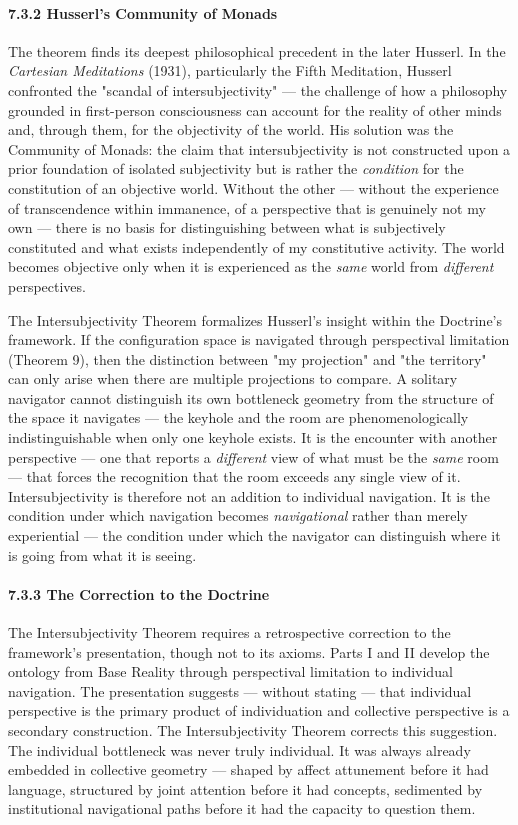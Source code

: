 \paragraph*{7.3.2 Husserl's Community of Monads}


The theorem finds its deepest philosophical precedent in the later Husserl. In the \textit{Cartesian Meditations} (1931), particularly the Fifth Meditation, Husserl confronted the "scandal of intersubjectivity" — the challenge of how a philosophy grounded in first-person consciousness can account for the reality of other minds and, through them, for the objectivity of the world. His solution was the Community of Monads: the claim that intersubjectivity is not constructed upon a prior foundation of isolated subjectivity but is rather the \textit{condition} for the constitution of an objective world. Without the other — without the experience of transcendence within immanence, of a perspective that is genuinely not my own — there is no basis for distinguishing between what is subjectively constituted and what exists independently of my constitutive activity. The world becomes objective only when it is experienced as the \textit{same} world from \textit{different} perspectives.


The Intersubjectivity Theorem formalizes Husserl's insight within the Doctrine's framework. If the configuration space is navigated through perspectival limitation (Theorem 9), then the distinction between "my projection" and "the territory" can only arise when there are multiple projections to compare. A solitary navigator cannot distinguish its own bottleneck geometry from the structure of the space it navigates — the keyhole and the room are phenomenologically indistinguishable when only one keyhole exists. It is the encounter with another perspective — one that reports a \textit{different} view of what must be the \textit{same} room — that forces the recognition that the room exceeds any single view of it. Intersubjectivity is therefore not an addition to individual navigation. It is the condition under which navigation becomes \textit{navigational} rather than merely experiential — the condition under which the navigator can distinguish where it is going from what it is seeing.


\paragraph*{7.3.3 The Correction to the Doctrine}


The Intersubjectivity Theorem requires a retrospective correction to the framework's presentation, though not to its axioms. Parts I and II develop the ontology from Base Reality through perspectival limitation to individual navigation. The presentation suggests — without stating — that individual perspective is the primary product of individuation and collective perspective is a secondary construction. The Intersubjectivity Theorem corrects this suggestion. The individual bottleneck was never truly individual. It was always already embedded in collective geometry — shaped by affect attunement before it had language, structured by joint attention before it had concepts, sedimented by institutional navigational paths before it had the capacity to question them.


